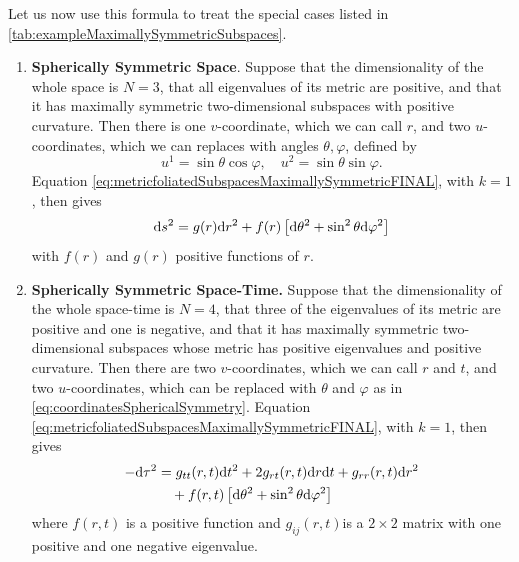 Let us now use this formula to treat the special cases listed in \ref{tab:exampleMaximallySymmetricSubspaces}.
\begin{enumerate}
\item \textbf{Spherically Symmetric Space}. Suppose that the dimensionality of the whole space is $N=3$, that all eigenvalues of its metric are positive, and that it has maximally symmetric two-dimensional subspaces with positive curvature. Then there is one $v$-coordinate, which we can call $r$, and two $u$-coordinates, which we can replaces with angles $\theta,\varphi$, defined by
\begin{equation}
\label{eq:coordinatesSphericalSymmetry}
	u^1=\sin\theta \cos \varphi, \quad u^2= \sin \theta \sin \varphi.
\end{equation}
Equation \ref{eq:metricfoliatedSubspacesMaximallySymmetricFINAL}, with $k=1$, then gives
\begin{equation}
\label{eq:metricSphericallySymmetricSpace}
	\mathrm{d} s^2 = g(r) \mathrm{d} r^2 + f(r) \left[\mathrm{d} \theta^2 + \sin^2 \theta \mathrm{d} \varphi^2\right]
\end{equation}
with $f(r)$ and $g(r)$ positive functions of $r$.
\item \textbf{Spherically Symmetric Space-Time.} Suppose that the dimensionality of the whole space-time is $N=4$, that three of the eigenvalues of its metric are positive and one is negative, and that it has maximally symmetric two-dimensional subspaces whose metric has positive eigenvalues and positive curvature. Then there are two $v$-coordinates, which we can call $r$ and $t$, and two $u$-coordinates, which can be replaced with $\theta$ and $\varphi$ as in \ref{eq:coordinatesSphericalSymmetry}. Equation \ref{eq:metricfoliatedSubspacesMaximallySymmetricFINAL}, with $k=1$, then gives
\begin{align}
\label{eq:metricsphericallysymmetricspacetime}
	-\mathrm{d} \tau^2 &= g_{tt}(r,t) \mathrm{d} t^2 + 2 g_{rt}(r,t) \mathrm{d} r\mathrm{d} t + g_{rr}(r,t)\mathrm{d} r^2\nonumber \\
	&\quad + f(r,t) \left[\mathrm{d}\theta^2+\sin^2 \theta \mathrm{d} \varphi^2\right]
\end{align}
where $f(r,t)$ is a positive function and $g_{ij}(r,t)$is a $2\times2$ matrix with one positive and one negative eigenvalue.


\end{enumerate}
